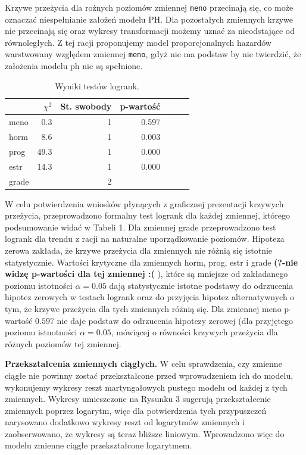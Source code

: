 \documentclass[]{article}
\begin{document}
Krzywe przeżycia dla rożnych poziomów zmiennej \texttt{meno} przecinają
się, co może oznaczać niespełnianie założeń modelu PH. Dla pozostałych
zmiennych krzywe nie przecinają się oraz wykresy transformacji możemy
uznać za nieodstające od równoległych. Z tej racji proponujemy model
proporcjonalnych hazardów warstwowany względem zmiennej \texttt{meno},
gdyż nie ma podstaw by nie twierdzić, że założenia modelu ph nie są
spełnione.

\begin{table}
\vspace{-20pt}
\caption{ Wyniki testów logrank. }
\begin{tabular}{lrrrrrr}
\toprule%
\ &$\chi^2$&St. swobody&p-wartość\\ \toprule meno&0.3&1&0.597\\ horm&8.6&1&0.003\\ prog&49.3&1&0.000\\ estr&14.3&1&0.000\\ grade&&2&\\  \bottomrule
\end{tabular}
\vspace{-7.5pt}
\end{table}

W celu potwierdzenia wniosków płynących z graficznej prezentacji krzywych
przeżycia, przeprowadzono formalny test logrank dla każdej zmiennej,
którego podsumowanie widać w Tabeli 1. Dla zmiennej grade przeprowadzono
test logrank dla trendu z racji na naturalne uporządkowanie poziomów. Hipoteza zerowa zakłada, że krzywe przeżycia dla zmiennych nie różnią się istotnie statystycznie.
Wartości krytyczne dla zmiennych \textsf{horm}, \textsf{prog},
\textsf{estr} i \textsf{grade} \textbf{ (?-nie widzę p-wartości dla tej zmiennej :( }), które są mniejsze od zakładanego
poziomu istotności \(\alpha=0.05\) dają statystycznie istotne podstawy
do odrzucenia hipotez zerowych w testach logrank oraz do przyjęcia
hipotez alternatywnych o tym, że krzywe przeżycia dla tych zmiennych
różnią się. Dla zmiennej \textsf{meno} p-wartość \(0.597\) nie daje
podstaw do odrzucenia hipotezy zerowej (dla przyjętego poziomu istnotności \(\alpha=0.05\), mówiącej o równości krzywych przeżycia dla różnych poziomów tej
zmiennej.

\newpage
\textbf{Przekształcenia zmiennych ciągłych.} \newline
W celu sprawdzenia, czy zmienne ciągłe nie powinny zostać przekształcone
przed wprowadzeniem ich do modelu, wykonujemy wykresy reszt
martyngałowych pustego modelu od każdej z tych zmiennych. Wykresy
umieszczone na Rysunku 3 sugerują przekształcenie zmiennych poprzez
logarytm, więc dla potwierdzenia tych przypuszczeń narysowano dodatkowo 
wykresy reszt od logarytmów zmiennych i zaobserwowano, że wykresy są teraz
bliższe liniowym. Wprowadzono więc do modelu zmienne ciągłe
przekształcone logarytmem.
\end{document}
